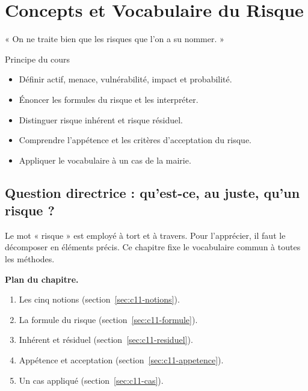 
\chapter{Concepts et Vocabulaire du Risque}
\label{chap:vocabrisque}

\epigraph{%
    « On ne traite bien que les risques que l'on a su nommer. »%
}{Principe du cours}


\begin{boxobjectifs}
\begin{itemize}
    \item Définir actif, menace, vulnérabilité, impact et probabilité.
    \item Énoncer les formules du risque et les interpréter.
    \item Distinguer risque inhérent et risque résiduel.
    \item Comprendre l'appétence et les critères d'acceptation du risque.
    \item Appliquer le vocabulaire à un cas de la mairie.
\end{itemize}
\end{boxobjectifs}

\bigskip

\section*{Question directrice : qu'est-ce, au juste, qu'un risque ?}

Le mot « risque » est employé à tort et à travers. Pour l'apprécier, il faut
le décomposer en éléments précis. Ce chapitre fixe le vocabulaire commun à
toutes les méthodes.

\medskip
\textbf{Plan du chapitre.}
\begin{enumerate}
    \item Les cinq notions (section~\ref{sec:c11-notions}).
    \item La formule du risque (section~\ref{sec:c11-formule}).
    \item Inhérent et résiduel (section~\ref{sec:c11-residuel}).
    \item Appétence et acceptation (section~\ref{sec:c11-appetence}).
    \item Un cas appliqué (section~\ref{sec:c11-cas}).
\end{enumerate}

